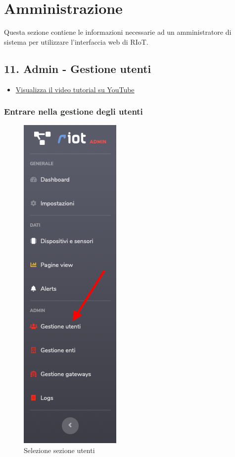 \section{Amministrazione}
Questa sezione contiene le informazioni necessarie ad un amministratore di sistema per utilizzare l'interfaccia web di RIoT.

\subsection{11. Admin - Gestione utenti}

	\begin{itemize}
		\item \href{https://www.youtube.com/watch?v=PjySMOLCtMA&list=PLPKYjnuIh1FA3b3jn_bwY_ztYzaFn2mIT&index=14}{Visualizza il video tutorial su YouTube} 
	\end{itemize}

	\subsubsection{Entrare nella gestione degli utenti}		
		\begin{figure}[H]
		\centering
		\includegraphics[scale=0.600]{res/images/admin/menuUtente.png}
		\caption{Selezione sezione utenti}
	\end{figure}

